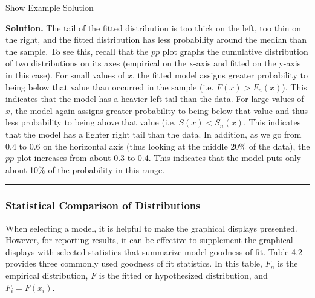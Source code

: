 \documentclass[]{book}
\theoremstyle{definition}
\theoremstyle{definition}
\theoremstyle{definition}
\theoremstyle{remark}
\begin{document}
Show Example Solution

\hypertarget{toggleExampleSelect.1.6}{}
\textbf{Solution.} The tail of the fitted distribution is too thick on
the left, too thin on the right, and the fitted distribution has less
probability around the median than the sample. To see this, recall that
the \(pp\) plot graphs the cumulative distribution of two distributions
on its axes (empirical on the x-axis and fitted on the y-axis in this
case). For small values of \(x\), the fitted model assigns greater
probability to being below that value than occurred in the sample (i.e.
\(F(x) > F_n(x)\)). This indicates that the model has a heavier left
tail than the data. For large values of \(x\), the model again assigns
greater probability to being below that value and thus less probability
to being above that value (i.e. \(S(x) < S_n(x)\). This indicates that
the model has a lighter right tail than the data. In addition, as we go
from 0.4 to 0.6 on the horizontal axis (thus looking at the middle 20\%
of the data), the \(pp\) plot increases from about 0.3 to 0.4. This
indicates that the model puts only about 10\% of the probability in this
range.

\begin{center}\rule{0.5\linewidth}{\linethickness}\end{center}

\subsubsection{Statistical Comparison of
Distributions}\label{S:MS:Tools:Stats}

When selecting a model, it is helpful to make the graphical displays
presented. However, for reporting results, it can be effective to
supplement the graphical displays with selected statistics that
summarize model goodness of fit. \protect\hyperlink{tab:42}{Table 4.2}
provides three commonly used goodness of fit statistics. In this table,
\(F_n\) is the empirical distribution, \(F\) is the fitted or
hypothesized distribution, and \(F_i = F(x_i)\).
\end{document}
